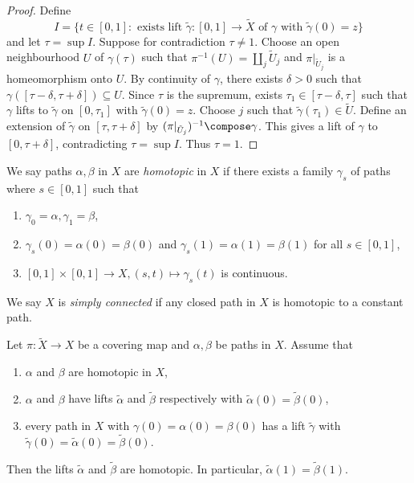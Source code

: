 \documentclass[a4paper]{article}
\begin{document}
\begin{proof}
  Define
  \[
    I = \{t \in [0, 1]: \text{ exists lift } \tilde \gamma: [0, 1] \to \tilde X \text{ of \(\gamma\) with } \tilde \gamma(0) = z\}
  \]
  and let \(\tau = \sup I\). Suppose for contradiction \(\tau \neq 1\). Choose an open neighbourhood \(U\) of \(\gamma(\tau)\) such that \(\pi^{-1}(U) = \coprod_j \tilde U_j\) and \(\pi|_{\tilde U_j}\) is a homeomorphism onto \(U\). By continuity of \(\gamma\), there exists \(\delta > 0\) such that \(\gamma([\tau - \delta, \tau + \delta]) \subseteq U\). Since \(\tau\) is the supremum, exists \(\tau_1 \in [\tau - \delta, \tau]\) such that \(\gamma\) lifts to \(\tilde \gamma\) on \([0, \tau_1]\) with \(\tilde \gamma(0) = z\). Choose \(j\) such that \(\tilde \gamma(\tau_1) \in \tilde U\). Define an extension of \(\tilde \gamma\) on \([\tau, \tau + \delta]\) by \((\pi|_{\tilde U_j})^{-1} \compose \gamma\). This gives a lift of \(\gamma\) to \([0, \tau + \delta]\), contradicting \(\tau = \sup I\). Thus \(\tau = 1\).
\end{proof}

\begin{definition}[homotopy]
  We say paths \(\alpha, \beta\) in \(X\) are \emph{homotopic} in \(X\) if there exists a family \(\gamma_s\) of paths where \(s \in [0, 1]\) such that
  \begin{enumerate}
  \item \(\gamma_0 = \alpha, \gamma_1 = \beta\),
  \item \(\gamma_s(0) = \alpha(0) = \beta(0)\) and \(\gamma_s(1) = \alpha(1) = \beta(1)\) for all \(s \in [0, 1]\),
  \item \([0, 1] \times [0, 1] \to X, (s, t) \mapsto \gamma_s(t)\) is continuous.
  \end{enumerate}
\end{definition}

\begin{definition}
  We say \(X\) is \emph{simply connected} if any closed path in \(X\) is homotopic to a constant path.
\end{definition}

\begin{theorem}
  Let \(\pi: \tilde X \to X\) be a covering map and \(\alpha, \beta\) be paths in \(X\). Assume that
  \begin{enumerate}
  \item \(\alpha\) and \(\beta\) are homotopic in \(X\),
  \item \(\alpha\) and \(\beta\) have lifts \(\tilde \alpha\) and \(\tilde \beta\) respectively with \(\tilde \alpha(0) = \tilde \beta(0)\),
  \item every path in \(X\) with \(\gamma(0) = \alpha(0) = \beta(0)\) has a lift \(\tilde \gamma\) with \(\tilde \gamma(0) = \tilde \alpha(0) = \tilde \beta(0)\).
  \end{enumerate}
  Then the lifts \(\tilde \alpha\) and \(\tilde \beta\) are homotopic. In particular, \(\tilde \alpha(1) = \tilde \beta(1)\).
\end{theorem}
\end{document}
